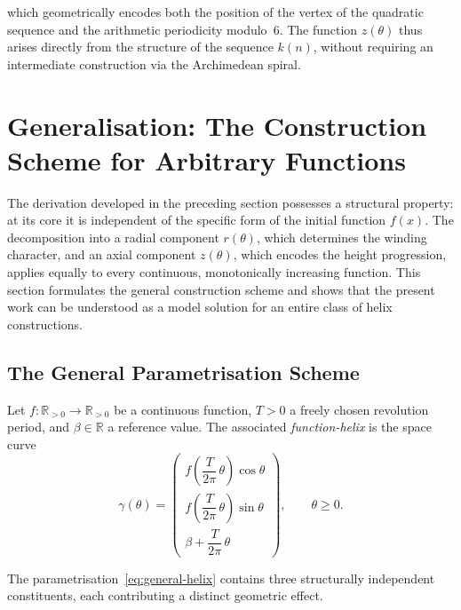 which geometrically encodes both the position of the vertex of the
quadratic sequence and the arithmetic periodicity modulo~$6$. The
function $z(\theta)$ thus arises directly from the structure of the
sequence $k(n)$, without requiring an intermediate construction via the
Archimedean spiral.

\section{Generalisation: The Construction Scheme for Arbitrary Functions}

The derivation developed in the preceding section possesses a structural property: at its core it is independent of the specific form
of the initial function $f(x)$. The decomposition into a radial
component $r(\theta)$, which determines the winding character, and an
axial component $z(\theta)$, which encodes the height progression,
applies equally to every continuous, monotonically increasing function.
This section formulates the general construction scheme and shows that
the present work can be understood as a model solution for an entire
class of helix constructions.

\subsection{The General Parametrisation Scheme}

\begin{definition}\label{def:function-helix}
Let $f: \mathbb{R}_{>0} \to \mathbb{R}_{>0}$ be a continuous function,
$T > 0$ a freely chosen revolution period, and $\beta \in \mathbb{R}$
a reference value. The associated \emph{function-helix} is the space
curve
\begin{equation}
\label{eq:general-helix}
\gamma(\theta)
=
\begin{pmatrix}
f\!\left(\dfrac{T}{2\pi}\,\theta\right)\cos\theta\\[8pt]
f\!\left(\dfrac{T}{2\pi}\,\theta\right)\sin\theta\\[8pt]
\beta + \dfrac{T}{2\pi}\,\theta
\end{pmatrix},
\qquad \theta \geq 0.
\end{equation}
\end{definition}

The parametrisation~\eqref{eq:general-helix} contains three structurally
independent constituents, each contributing a distinct geometric effect.

